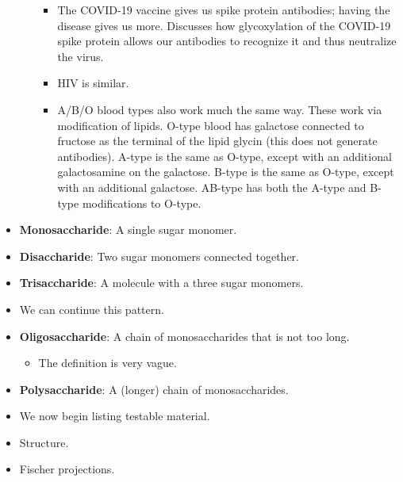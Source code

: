\documentclass[../notes.tex]{subfiles}
\begin{document}
\begin{itemize}
\begin{itemize}
\begin{itemize}
            \item The COVID-19 vaccine gives us spike protein antibodies; having the disease gives us more. Discusses how glycoxylation of the COVID-19 spike protein allows our antibodies to recognize it and thus neutralize the virus.
            \item HIV is similar.
            \item A/B/O blood types also work much the same way. These work via modification of lipids. O-type blood has galactose connected to fructose as the terminal of the lipid glycin (this does not generate antibodies). A-type is the same as O-type, except with an additional galactosamine on the galactose. B-type is the same as O-type, except with an additional galactose. AB-type has both the A-type and B-type modifications to O-type.
        \end{itemize}
    \end{itemize}
    \item \textbf{Monosaccharide}: A single sugar monomer.
    \item \textbf{Disaccharide}: Two sugar monomers connected together.
    \item \textbf{Trisaccharide}: A molecule with a three sugar monomers.
    \item We can continue this pattern.
    \item \textbf{Oligosaccharide}: A chain of monosaccharides that is not too long.
    \begin{itemize}
        \item The definition is very vague.
    \end{itemize}
    \item \textbf{Polysaccharide}: A (longer) chain of monosaccharides.
    \item We now begin listing testable material.
    \item Structure.
    \item Fischer projections.
    \begin{figure}[h!]
        \centering
        \footnotesize
\end{figure}
\end{itemize}
\end{document}
